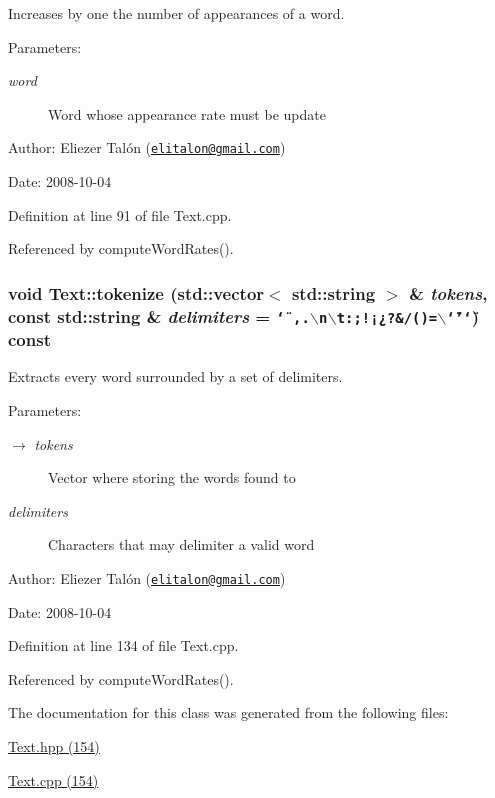 Increases by one the number of appearances of a word. 

\begin{Desc}
\item[Parameters:]
\begin{description}
\item[{\em word}]Word whose appearance rate must be update\end{description}
\end{Desc}
\begin{Desc}
\item[Author:]Eliezer Talón (\href{mailto:elitalon@gmail.com}{\tt elitalon@gmail.com}) \end{Desc}
\begin{Desc}
\item[Date:]2008-10-04 \end{Desc}


Definition at line 91 of file Text.cpp.

Referenced by computeWordRates().\hypertarget{class_text_6b26c004c1cac61015f7d49c364a007d}{
\subsubsection[tokenize]{\setlength{\rightskip}{0pt plus 5cm}void Text::tokenize (std::vector$<$ std::string $>$ \& {\em tokens}, \/  const std::string \& {\em delimiters} = {\tt \char`\"{}~,.$\backslash$n$\backslash$t:;!¡¿?\&/()=$\backslash$\char`\"{}'\char`\"{}}) const}}
\label{class_text_6b26c004c1cac61015f7d49c364a007d}


Extracts every word surrounded by a set of delimiters. 

\begin{Desc}
\item[Parameters:]
\begin{description}
\item[\mbox{$\rightarrow$} {\em tokens}]Vector where storing the words found to \item[{\em delimiters}]Characters that may delimiter a valid word\end{description}
\end{Desc}
\begin{Desc}
\item[Author:]Eliezer Talón (\href{mailto:elitalon@gmail.com}{\tt elitalon@gmail.com}) \end{Desc}
\begin{Desc}
\item[Date:]2008-10-04 \end{Desc}


Definition at line 134 of file Text.cpp.

Referenced by computeWordRates().

The documentation for this class was generated from the following files:\begin{CompactItemize}
\item 
\hyperlink{_text_8hpp}{Text.hpp (154)}\item 
\hyperlink{_text_8cpp}{Text.cpp (154)}\end{CompactItemize}
